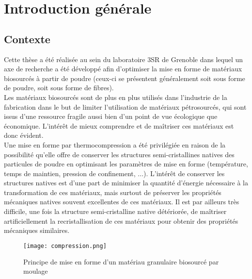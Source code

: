 \graphicspath{{./02-Projet/images/}}

\chapter{Introduction générale}
\label{chap:intro}

\section*{Contexte}
Cette thèse a été réalisée au sein du laboratoire 3SR de Grenoble dans lequel un axe de recherche a été développé afin d'optimiser la mise en forme de matériaux biosourcés à partir de poudre (ceux-ci se présentent généralement soit sous forme de poudre, soit sous forme de fibres).
\\Les matériaux biosourcés sont de plus en plus utilisés dans l'industrie de la fabrication dans le but de limiter l'utilisation de matériaux pétrosourcés, qui sont issus d'une ressource fragile aussi bien d'un point de vue écologique que économique. L'intérêt de mieux comprendre et de maîtriser ces matériaux est donc évident.
\\Une mise en forme par thermocompression a été privilégiée en raison de la possibilité qu'elle offre  de conserver les structures semi-cristallines natives des particules de poudre en optimisant les paramètres de mise en forme (température, temps de maintien, pression de confinement, ...). L'intérêt de conserver les structures natives est d'une part de minimiser la quantité d'énergie nécessaire à la transformation de ces matériaux, mais surtout de préserver les propriétés mécaniques natives souvent excellentes de ces matériaux. Il est par ailleurs très difficile, une fois la structure semi-cristalline native détériorée, de maîtriser artificiellement la recristallisation de ces matériaux pour obtenir des propriétés mécaniques similaires.
\begin{figure}\centering
	\texttt{[image: compression.png]}
	\caption{\label{fig:02-compression}Principe de mise en forme d'un matériau granulaire biosourcé par moulage}
\end{figure}
